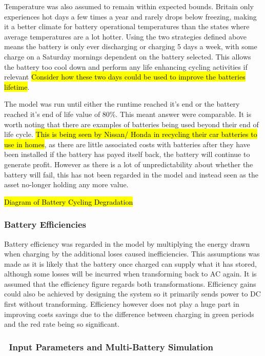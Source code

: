 Temperature was also assumed to remain within expected bounds. Britain
only experiences hot days a few times a year and rarely drops below
freezing, making it a better climate for battery operational
temperatures than the states where average temperatures are a lot
hotter. Using the two strategies defined above means the battery is only
ever discharging or charging 5 days a week, with some charge on a
Saturday mornings dependent on the battery selected. This allows the
battery too cool down and perform any life enhancing cycling activities
if relevant
\hl{Consider how these two days could be used to improve the batteries lifetime}.

The model was run until either the runtime reached it's end or the
battery reached it's end of life value of 80\%. This meant answer were
comparable. It is worth noting that there are examples of batteries
being used beyond their end of life cycle.
\hl{This is being seen by Nissan/ Honda in recycling their car batteries to use in homes},
as there are little associated costs with batteries after they have been
installed if the battery has payed itself back, the battery will
continue to generate profit. However as there is a lot of
unpredictability about whether the battery will fail, this has not been
regarded in the model and instead seen as the asset no-longer holding
any more value.

\hl{Diagram of Battery Cycling Degradation}

\subsubsection{Battery Efficiencies}\label{battery-efficiencies}

Battery efficiency was regarded in the model by multiplying the energy
drawn when charging by the additional loses caused inefficiencies. This
assumptions was made as it is likely that the battery once charged can
supply what it has stored, although some losses will be incurred when
transforming back to AC again. It is assumed that the efficiency figure
regards both transformations. Efficiency gains could also be achieved by
designing the system so it primarily sends power to DC first without
transforming. Efficiency however does not play a huge part in improving
costs savings due to the difference between charging in green periods
and the red rate being so significant.

\subsubsection{~Input Parameters and Multi-Battery
Simulation}\label{input-parameters-and-multi-battery-simulation}

